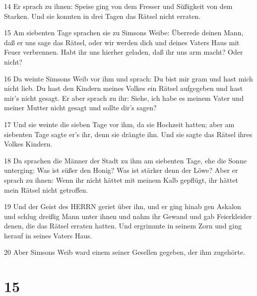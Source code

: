 \par 14 Er sprach zu ihnen: Speise ging von dem Fresser und Süßigkeit von dem Starken. Und sie konnten in drei Tagen das Rätsel nicht erraten.
\par 15 Am siebenten Tage sprachen sie zu Simsons Weibe: Überrede deinen Mann, daß er uns sage das Rätsel, oder wir werden dich und deines Vaters Haus mit Feuer verbrennen. Habt ihr uns hierher geladen, daß ihr uns arm macht? Oder nicht?
\par 16 Da weinte Simsons Weib vor ihm und sprach: Du bist mir gram und hast mich nicht lieb. Du hast den Kindern meines Volkes ein Rätsel aufgegeben und hast mir's nicht gesagt. Er aber sprach zu ihr: Siehe, ich habe es meinem Vater und meiner Mutter nicht gesagt und sollte dir's sagen?
\par 17 Und sie weinte die sieben Tage vor ihm, da sie Hochzeit hatten; aber am siebenten Tage sagte er's ihr, denn sie drängte ihn. Und sie sagte das Rätsel ihres Volkes Kindern.
\par 18 Da sprachen die Männer der Stadt zu ihm am siebenten Tage, ehe die Sonne unterging: Was ist süßer den Honig? Was ist stärker denn der Löwe? Aber er sprach zu ihnen: Wenn ihr nicht hättet mit meinem Kalb gepflügt, ihr hättet mein Rätsel nicht getroffen.
\par 19 Und der Geist des HERRN geriet über ihn, und er ging hinab gen Askalon und schlug dreißig Mann unter ihnen und nahm ihr Gewand und gab Feierkleider denen, die das Rätsel erraten hatten. Und ergrimmte in seinem Zorn und ging herauf in seines Vaters Haus.
\par 20 Aber Simsons Weib ward einem seiner Gesellen gegeben, der ihm zugehörte.

\chapter{15}

